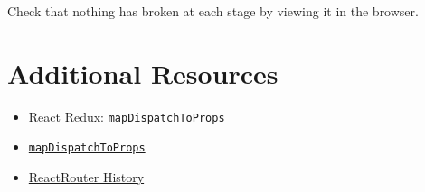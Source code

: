 Check that nothing has broken at each stage by viewing it in the browser.


\section{Additional Resources}

\begin{itemize}[leftmargin=*]
    \item \href{https://react-redux.js.org/using-react-redux/connect-mapdispatch}{React Redux: \texttt{mapDispatchToProps}}
    \item \href{https://learn.co/lessons/map-dispatch-to-props-readme}{\texttt{mapDispatchToProps}}
    \item \href{https://github.com/ReactTraining/history}{ReactRouter History}
\end{itemize}
